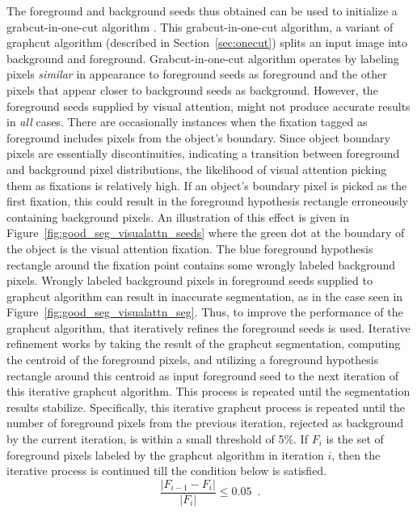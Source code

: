 The foreground and background seeds thus obtained can be used to initialize a grabcut-in-one-cut algorithm \cite{onecut}. This grabcut-in-one-cut algorithm, a variant of graphcut algorithm (described in Section~\ref{sec:onecut}) splits an input image into background and foreground. Grabcut-in-one-cut algorithm operates by labeling pixels \textit{similar} in appearance to foreground seeds as foreground and the other pixels that appear closer to background seeds as background.
However, the foreground seeds supplied by visual attention, might not produce accurate results in \emph{all} cases. There are occasionally instances when the fixation tagged as foreground includes pixels from the object's boundary. Since object boundary pixels are essentially discontinuities, indicating a transition between foreground and background pixel distributions, the likelihood of visual attention picking them as fixations is relatively high. If an object's boundary pixel is picked as the first fixation, this could result in the foreground hypothesis rectangle erroneously containing background pixels. An illustration of this effect is given in Figure~\ref{fig:good_seg_visualattn_seeds} where the green dot at the boundary of the object is the visual attention fixation. The blue foreground hypothesis rectangle around the fixation point contains some wrongly labeled background pixels. Wrongly labeled background pixels in foreground seeds supplied to graphcut algorithm can result in inaccurate segmentation, as in the case seen in 
Figure~\ref{fig:good_seg_visualattn_seg}. Thus, to improve the performance of the graphcut algorithm, that iteratively refines the foreground seeds is used. Iterative refinement works by taking the result of the graphcut segmentation, computing the centroid of the foreground pixels, and utilizing a foreground hypothesis rectangle around this centroid as input foreground seed to the next iteration of this iterative graphcut algorithm. This process is repeated until the segmentation results stabilize. Specifically, this iterative graphcut process is repeated 
until the number of foreground pixels from the previous iteration, rejected as background by the current iteration, is within a small threshold of 5\%. If $F_i$ is the set of foreground pixels labeled by the graphcut algorithm in iteration $i$, then the iterative process is continued till the condition below is satisfied.
%
\begin{equation}
 \label{eqn:seg_threshold}
 \frac{|F_{i-1}-F_{i}|}{|F_i|} \leq 0.05\enspace .
\end{equation}
